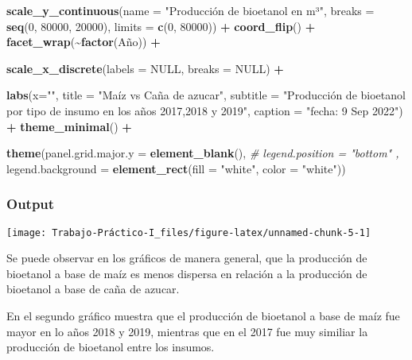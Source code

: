 \documentclass[
]{article}
\newenvironment{Shaded}{\begin{snugshade}}{\end{snugshade}}
\newcommand{\AttributeTok}[1]{\textcolor[rgb]{0.13,0.29,0.53}{#1}}
\newcommand{\CommentTok}[1]{\textcolor[rgb]{0.56,0.35,0.01}{\textit{#1}}}
\newcommand{\ConstantTok}[1]{\textcolor[rgb]{0.56,0.35,0.01}{#1}}
\newcommand{\DecValTok}[1]{\textcolor[rgb]{0.00,0.00,0.81}{#1}}
\newcommand{\FunctionTok}[1]{\textcolor[rgb]{0.13,0.29,0.53}{\textbf{#1}}}
\newcommand{\NormalTok}[1]{#1}
\newcommand{\SpecialCharTok}[1]{\textcolor[rgb]{0.81,0.36,0.00}{\textbf{#1}}}
\newcommand{\StringTok}[1]{\textcolor[rgb]{0.31,0.60,0.02}{#1}}
\begin{document}
\begin{Shaded}
\begin{Highlighting}[]
  \FunctionTok{scale\_y\_continuous}\NormalTok{(}\AttributeTok{name =} \StringTok{"Producción de bioetanol en m³"}\NormalTok{,}
                     \AttributeTok{breaks =} \FunctionTok{seq}\NormalTok{(}\DecValTok{0}\NormalTok{, }\DecValTok{80000}\NormalTok{, }\DecValTok{20000}\NormalTok{), }
                     \AttributeTok{limits =} \FunctionTok{c}\NormalTok{(}\DecValTok{0}\NormalTok{, }\DecValTok{80000}\NormalTok{)) }\SpecialCharTok{+}
  \FunctionTok{coord\_flip}\NormalTok{() }\SpecialCharTok{+}
  \FunctionTok{facet\_wrap}\NormalTok{(}\SpecialCharTok{\textasciitilde{}}\FunctionTok{factor}\NormalTok{(Año)) }\SpecialCharTok{+}
  
  \FunctionTok{scale\_x\_discrete}\NormalTok{(}\AttributeTok{labels =} \ConstantTok{NULL}\NormalTok{, }\AttributeTok{breaks =} \ConstantTok{NULL}\NormalTok{) }\SpecialCharTok{+} 
  
  \FunctionTok{labs}\NormalTok{(}\AttributeTok{x=}\StringTok{""}\NormalTok{, }\AttributeTok{title =} \StringTok{"Maíz vs Caña de azucar"}\NormalTok{, }
       \AttributeTok{subtitle =} \StringTok{"Producción de bioetanol por tipo de insumo en los años 2017,2018 y 2019"}\NormalTok{, }
       \AttributeTok{caption =} \StringTok{"fecha: 9 Sep 2022"}\NormalTok{) }\SpecialCharTok{+}
  \FunctionTok{theme\_minimal}\NormalTok{() }\SpecialCharTok{+}
  
  \FunctionTok{theme}\NormalTok{(}\AttributeTok{panel.grid.major.y =} \FunctionTok{element\_blank}\NormalTok{(),}
       \CommentTok{\# legend.position = "bottom" ,}
        \AttributeTok{legend.background =} \FunctionTok{element\_rect}\NormalTok{(}\AttributeTok{fill =} \StringTok{"white"}\NormalTok{, }\AttributeTok{color =} \StringTok{"white"}\NormalTok{))}
\end{Highlighting}
\end{Shaded}

\subsubsection{Output}\label{output-1}

\begin{center}\texttt{[image: Trabajo-Práctico-I\_files/figure-latex/unnamed-chunk-5-1]} \end{center}

Se puede observar en los gráficos de manera general, que la producción
de bioetanol a base de maíz es menos dispersa en relación a la
producción de bioetanol a base de caña de azucar.

En el segundo gráfico muestra que el producción de bioetanol a base de
maíz fue mayor en lo años 2018 y 2019, mientras que en el 2017 fue muy
similiar la producción de bioetanol entre los insumos.
\end{document}
